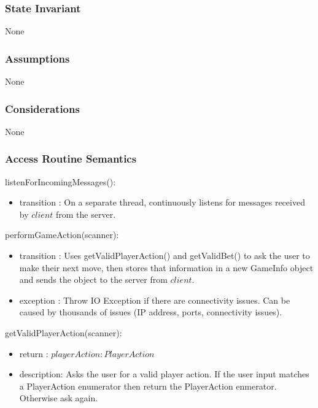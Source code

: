 \documentclass[12pt, titlepage]{article}
\begin{document}
    \subsubsection* {State Invariant}
        None
    
    \subsubsection* {Assumptions}
        None
    
    \subsubsection* {Considerations}
        None
    
    \subsubsection* {Access Routine Semantics}
    
        \noindent listenForIncomingMessages():
        \begin{itemize}
        \item transition : On a separate thread, continuously listens for messages received by $\mathit{client}$ from the server.
        \end{itemize}
        
        \noindent performGameAction(scanner):
        \begin{itemize}
        \item transition : Uses getValidPlayerAction() and getValidBet() to ask the user to make their next move, then stores that information in a new GameInfo object and sends the object to the server from $client$.
        \item exception : Throw IO Exception if there are connectivity issues. Can be caused by thousands of issues (IP address, ports, connectivity issues).
        \end{itemize}
        
        \noindent getValidPlayerAction(scanner):
        \begin{itemize}
        \item return : $playerAction : PlayerAction$
        \item description: Asks the user for a valid player action. If the user input matches a PlayerAction enumerator then return the PlayerAction enmerator. Otherwise ask again.
        \end{itemize}
        
\end{document}
